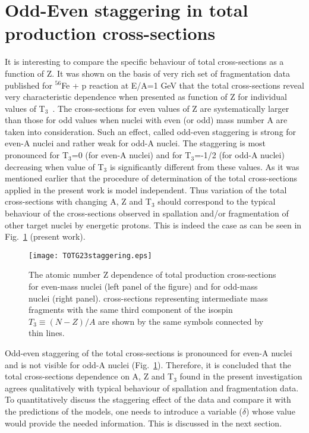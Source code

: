 \section{Odd-Even staggering in total production cross-sections}
  It is interesting to compare the specific behaviour of total
  cross-sections as a function of Z.  It was shown on the basis
  of very rich set of fragmentation data published for $^{56}$Fe + p
  reaction at E/A=1 GeV that the total cross-sections reveal very characteristic dependence when presented as function of Z for individual values of T$_3$~\cite{napolitani2007measurement}. The cross-sections for even values of Z are systematically larger than those for odd values when nuclei with even (or odd) mass number A are taken into consideration.
  Such an effect, called odd-even staggering is
  strong for even-A nuclei and rather weak for odd-A nuclei.
  The staggering is most pronounced for
  T$_3$=0 (for even-A nuclei) and for T$_3$=-1/2 (for odd-A nuclei)
  decreasing when value of T$_3$ is significantly different from these values.
  As it was mentioned earlier that the
  procedure of determination of the total cross-sections applied in the present work is model
  independent.  Thus variation of the total cross-sections with
  changing A, Z and T$_3$ should correspond to the typical behaviour
  of the cross-sections observed in spallation and/or fragmentation
  of other target nuclei by energetic protons. This is indeed the
  case as can be seen in Fig.~\ref{fig:TOTG23staggering} (present work). 
\begin{figure}[!h]
  \centering
  \texttt{[image: TOTG23staggering.eps]}
  \caption{The atomic number Z dependence of total production cross-sections
  for even-mass nuclei (left panel of the figure) and for odd-mass nuclei (right panel).
  cross-sections representing intermediate mass fragments with the same third component
  of the isospin $T_3 \equiv (N-Z)/A$
  are shown by the same symbols connected by thin lines.
  }
  \label{fig:TOTG23staggering}
\end{figure}
%
  Odd-even staggering of the total cross-sections is pronounced for even-A nuclei and is  not visible for odd-A
  nuclei (Fig.~\ref{fig:TOTG23staggering}).
  Therefore, it is concluded that the total cross-sections dependence
  on A, Z and T$_3$ found in the present investigation agrees qualitatively with typical behaviour of
  spallation and fragmentation data. 
To quantitatively discuss the staggering effect of the data and compare it with the predictions of the models, one needs to introduce a variable ($\delta$) whose value would provide the needed information. This is discussed in the next section.
%
